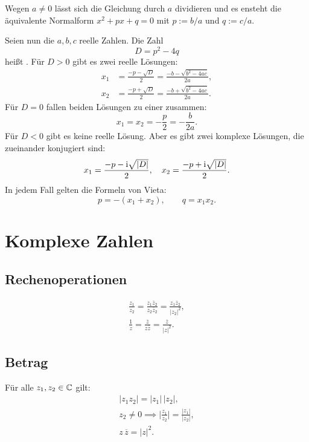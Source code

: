 \noindent
Wegen $a\ne 0$ lässt sich die Gleichung durch $a$ dividieren
und es ensteht die äquivalente Normalform $x^2+px+q=0$
mit $p:=b/a$ und $q:=c/a$.

Seien nun die $a,b,c$ reelle Zahlen. Die Zahl
\begin{equation}
D = p^2-4q
\end{equation}
heißt . Für $D>0$ gibt es zwei reelle Lösungen:
\begin{align}
x_1 &= \frac{-p-\sqrt{D}}{2} = \frac{-b-\sqrt{b^2-4ac}}{2a},\\
x_2 &= \frac{-p+\sqrt{D}}{2} = \frac{-b+\sqrt{b^2-4ac}}{2a}.
\end{align}
Für $D=0$ fallen beiden Lösungen zu einer 
zusammen:
\begin{equation}
x_1 = x_2 = -\frac{p}{2} = -\frac{b}{2a}.
\end{equation}
Für $D<0$ gibt es keine reelle Lösung. Aber es gibt zwei komplexe
Lösungen, die zueinander konjugiert sind:
\begin{equation}
x_1 = \frac{-p-\mathrm i\sqrt{|D|}}{2},\quad
x_2 = \frac{-p+\mathrm i\sqrt{|D|}}{2}.
\end{equation}
In jedem Fall gelten die Formeln von Vieta:
\begin{equation}
p = -(x_1+x_2),\qquad q = x_1 x_2.
\end{equation}

\section{Komplexe Zahlen}
\subsection{Rechenoperationen}

\begin{gather}
\frac{z_1}{z_2}
= \frac{z_1\overline z_2}{z_2\overline z_2}
= \frac{z_1\overline z_2}{|z_2|^2},\\
\frac{1}{z} = \frac{\overline z}{z\overline z}
= \frac{\overline z}{|z|^2}.
\end{gather}

\subsection{Betrag}
Für alle $z_1,z_2\in\mathbb C$ gilt:
\begin{gather}
|z_1z_2| = |z_1|\,|z_2|,\\
z_2\ne 0\implies \Big|\frac{z_1}{z_2}\Big|
= \frac{|z_1|}{|z_2|},\\
z\,\overline z = |z|^2.
\end{gather}

